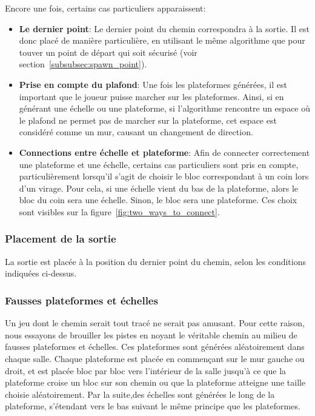 \documentclass[10pt]{report}
\begin{document}
Encore une fois, certains cas particuliers apparaissent:
\begin{itemize}
  \item \textbf{Le dernier point}: Le dernier point du chemin correspondra à la sortie.
  Il est donc placé de manière particulière, en utilisant le
  même algorithme que pour touver un point de départ qui soit sécurisé (voir section~\ref{subsubsec:spawn_point}).
  \item \textbf{Prise en compte du plafond}: Une fois les plateformes
  générées, il est important que le joueur puisse marcher sur les plateformes.
  Ainsi, si en générant une échelle ou une plateforme, si
  l'algorithme rencontre un espace où le plafond ne permet pas de marcher
  sur la plateforme, cet espace est considéré comme un mur, causant un
  changement de direction.
  \item \textbf{Connections entre échelle et plateforme}: Afin de connecter
  correctement une plateforme et une échelle, certains cas particuliers
  sont pris en compte, particulièrement lorsqu'il s'agit de choisir le bloc
  correspondant à un coin lors d'un virage.
  Pour cela, si une échelle vient du bas de la plateforme, alors le bloc du coin sera une échelle.
  Sinon, le bloc sera une plateforme.
  Ces choix sont visibles sur la figure~\ref{fig:two_ways_to_connect}.
\end{itemize}

\subsubsection{Placement de la sortie}

La sortie est placée à la position du dernier point du chemin, selon
les conditions indiquées ci-dessus.

\subsubsection{Fausses plateformes et échelles}

Un jeu dont le chemin serait tout tracé ne serait pas amusant.
Pour cette raison, nous essayons de brouiller les pistes en noyant le
véritable chemin au milieu de fausses plateformes et échelles.
Ces plateformes sont générées aléatoirement dans chaque salle.
Chaque plateforme est placée en commençant sur le mur gauche ou droit,
et est placée bloc par bloc vers l'intérieur de la salle jusqu'à ce
que la plateforme croise un bloc sur son chemin ou
que la plateforme atteigne une taille choisie aléatoirement.
Par la suite,des échelles sont générées le long de la plateforme,
s'étendant vers le bas suivant le même principe que les plateformes.
\end{document}
